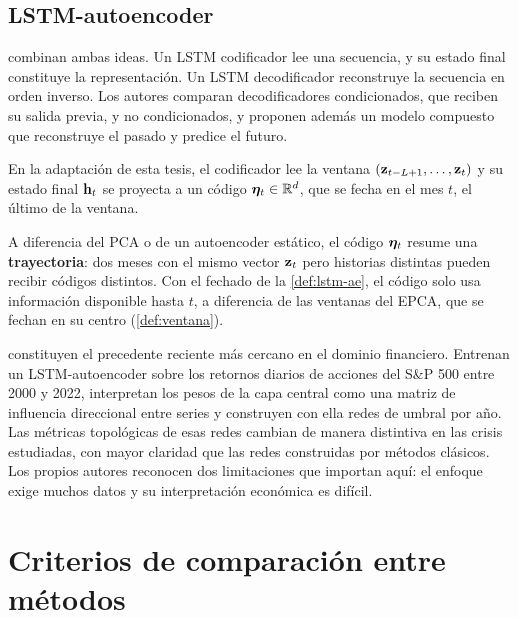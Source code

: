 \subsection{LSTM-autoencoder}

\textcite{srivastava_mansimov_salakhutdinov_2015} combinan ambas ideas. Un LSTM codificador lee una secuencia, y su estado final
constituye la representación. Un LSTM decodificador reconstruye la secuencia en orden inverso. Los
autores comparan decodificadores condicionados, que reciben su salida previa, y no condicionados,
y proponen además un modelo compuesto que reconstruye el pasado y predice el futuro.

\begin{definicion}\label{def:lstm-ae}
En la adaptación de esta tesis, el codificador lee la ventana $(\mathbf{z}_{t-L+1},\dots,\mathbf{z}_t)$ y su
estado final $\mathbf{h}_t$ se proyecta a un código $\boldsymbol{\eta}_t\in\mathbb{R}^{d}$, que se fecha en el mes $t$, el
último de la ventana.
\end{definicion}

A diferencia del PCA o de un autoencoder estático, el código $\boldsymbol{\eta}_t$ resume una
\textbf{trayectoria}: dos meses con el mismo vector $\mathbf{z}_t$ pero historias distintas pueden recibir
códigos distintos. Con el fechado de la \cref{def:lstm-ae}, el código solo usa información
disponible hasta $t$, a diferencia de las ventanas del EPCA, que se fechan en su centro
(\cref{def:ventana}).

\textcite{tuhin_et_al_2025}
constituyen el precedente reciente más cercano en el dominio financiero. Entrenan un
LSTM-autoencoder sobre los retornos diarios de acciones del S\&P 500 entre 2000 y 2022, interpretan
los pesos de la capa central como una matriz de influencia direccional entre series y construyen con
ella redes de umbral por año. Las métricas topológicas de esas redes cambian de manera distintiva en
las crisis estudiadas, con mayor claridad que las redes construidas por métodos clásicos. Los
propios autores reconocen dos limitaciones que importan aquí: el enfoque exige muchos datos y su
interpretación económica es difícil.

\section{Criterios de comparación entre métodos}
\label{sec:criterios}

